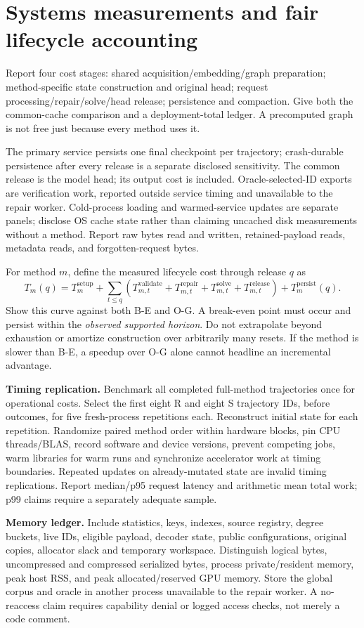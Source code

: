 \documentclass[11pt,a4paper]{article}
\begin{document}
\section{Systems measurements and fair lifecycle accounting}
Report four cost stages: shared acquisition/embedding/graph preparation; method-specific state construction and original head; request processing/repair/solve/head release; persistence and compaction. Give both the common-cache comparison and a deployment-total ledger. A precomputed graph is not free just because every method uses it.

The primary service persists one final checkpoint per trajectory; crash-durable persistence after every release is a separate disclosed sensitivity. The common release is the model head; its output cost is included. Oracle-selected-ID exports are verification work, reported outside service timing and unavailable to the repair worker. Cold-process loading and warmed-service updates are separate panels; disclose OS cache state rather than claiming uncached disk measurements without a method. Report raw bytes read and written, retained-payload reads, metadata reads, and forgotten-request bytes.

For method $m$, define the measured lifecycle cost through release $q$ as
\[
 T_m(q)=T_m^{\mathrm{setup}}+\sum_{t\le q}
 (T_{m,t}^{\mathrm{validate}}+T_{m,t}^{\mathrm{repair}}+
 T_{m,t}^{\mathrm{solve}}+T_{m,t}^{\mathrm{release}})+T_m^{\mathrm{persist}}(q).
\]
Show this curve against both B-E and O-G. A break-even point must occur and persist within the \emph{observed supported horizon}. Do not extrapolate beyond exhaustion or amortize construction over arbitrarily many resets. If the method is slower than B-E, a speedup over O-G alone cannot headline an incremental advantage.

\textbf{Timing replication.} Benchmark all completed full-method trajectories once for operational costs. Select the first eight R and eight S trajectory IDs, before outcomes, for five fresh-process repetitions each. Reconstruct initial state for each repetition. Randomize paired method order within hardware blocks, pin CPU threads/BLAS, record software and device versions, prevent competing jobs, warm libraries for warm runs and synchronize accelerator work at timing boundaries. Repeated updates on already-mutated state are invalid timing replications. Report median/p95 request latency and arithmetic mean total work; p99 claims require a separately adequate sample.

\textbf{Memory ledger.} Include statistics, keys, indexes, source registry, degree buckets, live IDs, eligible payload, decoder state, public configurations, original copies, allocator slack and temporary workspace. Distinguish logical bytes, uncompressed and compressed serialized bytes, process private/resident memory, peak host RSS, and peak allocated/reserved GPU memory. Store the global corpus and oracle in another process unavailable to the repair worker. A no-reaccess claim requires capability denial or logged access checks, not merely a code comment.
\end{document}
